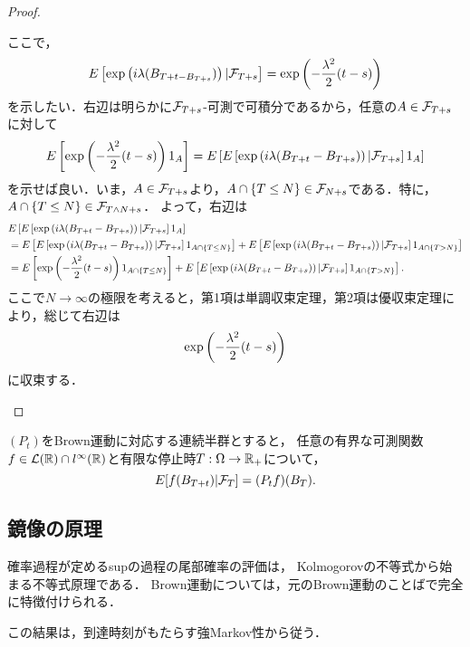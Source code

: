 \documentclass[uplatex,dvipdfmx]{jsreport}
\begin{document}
\begin{proof}
\begin{description}
        ここで，
        \[E\left[\exp\left(i\lambda(B_{T+t-B_{T+s}})\right)|\mathcal{F}_{T+s}\right]=\exp\left(-\frac{\lambda^2}{2}(t-s)\right)\]
        を示したい．右辺は明らかに$\mathcal{F}_{T+s}$-可測で可積分であるから，任意の$A\in\mathcal{F}_{T+s}$に対して
        \[E\left[\exp\left(-\frac{\lambda^2}{2}(t-s)\right)1_A\right]=E\left[E\left[\exp\left(i\lambda(B_{T+t}-B_{T+s})\right)|\mathcal{F}_{T+s}\right]1_{A}\right]\]
        を示せば良い．いま，$A\in\mathcal{F}_{T+s}$より，$A\cap\left\{T\le N\right\}\in\mathcal{F}_{N+s}$である．特に，$A\cap\left\{T\le N\right\}\in\mathcal{F}_{T\land N+s}$．
        よって，右辺は
        \begin{align*}
            &E\left[E\left[\exp\left(i\lambda(B_{T+t}-B_{T+s})\right)|\mathcal{F}_{T+s}\right]1_{A}\right]\\
            &=E\left[E\left[\exp\left(i\lambda(B_{T+t}-B_{T+s})\right)|\mathcal{F}_{T+s}\right]1_{A\cap\left\{T\le N\right\}}\right]+E\left[E\left[\exp\left(i\lambda(B_{T+t}-B_{T+s})\right)|\mathcal{F}_{T+s}\right]1_{A\cap\left\{T>N\right\}}\right]\\
            &=E\left[\exp\left(-\frac{\lambda^2}{2}(t-s)\right)1_{A\cap\left\{T\le N\right\}}\right]+E\left[E\left[\exp\left(i\lambda(B_{T+t}-B_{T+s})\right)|\mathcal{F}_{T+s}\right]1_{A\cap\left\{T>N\right\}}\right].
        \end{align*}
        ここで$N\to\infty$の極限を考えると，第1項は単調収束定理，第2項は優収束定理により，総じて右辺は
        \[\exp\left(-\frac{\lambda^2}{2}(t-s)\right)\]
        に収束する．
    \end{description}
\end{proof}

\begin{corollary}[時間一様性]
    $(P_t)$をBrown運動に対応する連続半群とすると，
    任意の有界な可測関数$f\in\mathcal{L}(\mathbb{R})\cap l^\infty(\mathbb{R})$と有限な停止時$T:\Omega\to\mathbb{R}_+$について，
    \[E[f(B_{T+t})|\mathcal{F}_T]=(P_tf)(B_T).\]
\end{corollary}

\subsection{鏡像の原理}

\begin{tcolorbox}[colframe=ForestGreen, colback=ForestGreen!10!white,breakable,colbacktitle=ForestGreen!40!white,coltitle=black,fonttitle=\bfseries\sffamily,
title=]
    確率過程が定めるsupの過程の尾部確率の評価は，
    Kolmogorovの不等式から始まる不等式原理である．
    Brown運動については，元のBrown運動のことばで完全に特徴付けられる．

    この結果は，到達時刻がもたらす強Markov性から従う．
\end{tcolorbox}
\end{document}
